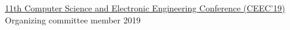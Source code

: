 

\begin{cvhonors}

  \cvhonor
    {\href{https://ceec.uk}{11th Computer Science and Electronic Engineering Conference (CEEC'19)}} %
    {Organizing committee member} %
    {} %
    {2019} %


\end{cvhonors}
